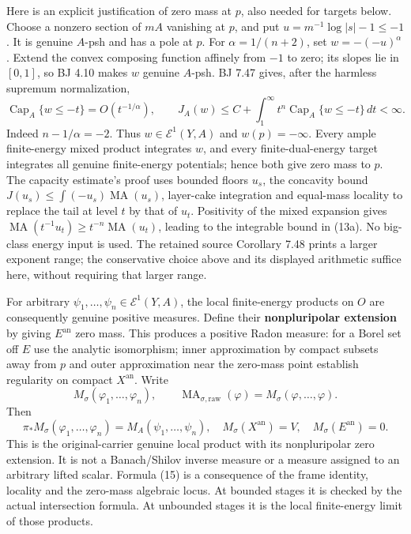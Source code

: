 \documentclass[
  10pt,
]{article}
\begin{document}
Here is an explicit justification of zero mass at \(p\), also needed for
targets below. Choose a nonzero section of \(mA\) vanishing at \(p\),
and put \(u=m^{-1}\log|s|-1\le-1\). It is genuine \(A\)-psh and has a
pole at \(p\). For \(\alpha=1/(n+2)\), set \(w=-(-u)^\alpha\). Extend
the convex composing function affinely from \(-1\) to zero; its slopes
lie in \([0,1]\), so BJ 4.10 makes \(w\) genuine \(A\)-psh. BJ 7.47
gives, after the harmless supremum normalization, \[
 \operatorname{Cap}_A\{w\le-t\}=O(t^{-1/\alpha}),\qquad
 J_A(w)\le C+\int_1^\infty t^n\operatorname{Cap}_A\{w\le-t\}\,dt<\infty.
 \tag{13a}
\] Indeed \(n-1/\alpha=-2\). Thus \(w\in\mathcal E^1(Y,A)\) and
\(w(p)=-\infty\). Every ample finite-energy mixed product integrates
\(w\), and every finite-dual-energy target integrates all genuine
finite-energy potentials; hence both give zero mass to \(p\). The
capacity estimate's proof uses bounded floors \(u_s\), the concavity
bound \(J(u_s)\le\int(-u_s)\operatorname{MA}(u_s)\), layer-cake
integration and equal-mass locality to replace the tail at level \(t\)
by that of \(u_t\). Positivity of the mixed expansion gives
\(\operatorname{MA}(t^{-1}u_t)\ge t^{-n}\operatorname{MA}(u_t)\),
leading to the integrable bound in (13a). No big-class energy input is
used. The retained source Corollary 7.48 prints a larger exponent range;
the conservative choice above and its displayed arithmetic suffice here,
without requiring that larger range.

For arbitrary \(\psi_1,\ldots,\psi_n\in\mathcal E^1(Y,A)\), the local
finite-energy products on \(O\) are consequently genuine positive
measures. Define their \textbf{nonpluripolar extension} by giving
\(E^{\mathrm{an}}\) zero mass. This produces a positive Radon measure:
for a Borel set off \(E\) use the analytic isomorphism; inner
approximation by compact subsets away from \(p\) and outer approximation
near the zero-mass point establish regularity on compact
\(X^{\mathrm{an}}\). Write \[
 M_\sigma(\varphi_1,\ldots,\varphi_n),\qquad
 \operatorname{MA}_{\sigma,\mathrm{raw}}(\varphi)
       =M_\sigma(\varphi,\ldots,\varphi).
 \tag{14}
\] Then \[
 \pi_*M_\sigma(\varphi_1,\ldots,\varphi_n)
       =M_A(\psi_1,\ldots,\psi_n),
 \quad M_\sigma(X^{\mathrm{an}})=V,
 \quad M_\sigma(E^{\mathrm{an}})=0.
 \tag{15}
\] This is the original-carrier genuine local product with its
nonpluripolar zero extension. It is not a Banach/Shilov inverse measure
or a measure assigned to an arbitrary lifted scalar. Formula (15) is a
consequence of the frame identity, locality and the zero-mass algebraic
locus. At bounded stages it is checked by the actual intersection
formula. At unbounded stages it is the local finite-energy limit of
those products.
\end{document}
